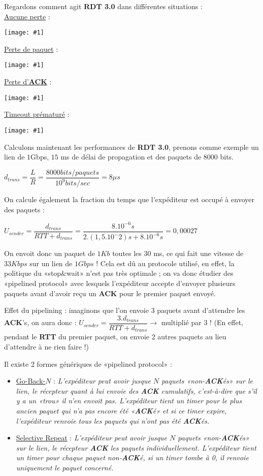 \documentclass{article}
\newcommand{\ora}[1]{\textcolor{darko}{#1}}
\newcommand{\imgR}[2]{\begin{center}\texttt{[image: \#1]}\end{center}}
\newcommand{\point}[2]{\item \ora{\underline{#1}} : \textit{#2}}
\begin{document}
Regardons comment agit \textbf{RDT 3.0} dans différentes situations : \\
\underline{Aucune perte} :  \imgR{CN_138.png}{300}
\newpage
\underline{Perte de paquet} :  \imgR{CN_139.png}{300}
\underline{Perte d'\textbf{ACK}} :  \imgR{CN_140.png}{300}

\newpage

\underline{Timeout prématuré} :  \imgR{CN_141.png}{300}

Calculons maintenant les performances de \textbf{RDT 3.0}, prenons comme exemple un lien de $1$Gbps, $15$ ms de 
délai de propagation et des paquets de 8000 bits.
\begin{center}
$d_{trans} = \dfrac{L}{R} = \dfrac{8000 bits/paquets}{10^9bits/sec} = 8\mu s$
\end{center}
On calcule également la fraction du temps que l'expéditeur est occupé à envoyer des paquets : 
\begin{center}
$U_{sender} = \dfrac{d_{trans}}{RTT+d_{trans}} = \dfrac{8.10^{-6}s}{2.(1,5.10^-2)s + 8.10^{-6}s} = 0,00027$
\end{center}

On envoit donc un paquet de $1Kb$ toutes les 30 ms, ce qui fait une vitesse de $33Kbps$ sur un lien de $1Gbps$ ! 
Cela est dû au protocole utilisé, en effet, la politique du «stop\&wait» n'est pas très optimale ; on va donc 
étudier des «pipelined protocol» avec lesquels l'expéditeur accepte d'envoyer plusieurs paquets avant d'avoir 
reçu un \textbf{ACK} pour le premier paquet envoyé.

Effet du pipelining : imaginons que l'on envoie 3 paquets avant d'attendre les \textbf{ACK}'s, on aura donc : 
$U_{sender} = \dfrac{3.d_{trans}}{RTT+d_{trans}} \rightarrow$ multiplié par 3 ! (En effet, pendant le 
\textbf{RTT} du premier paquet, on envoie 2 autres paquets au lieu d'attendre à ne rien faire !)

Il existe 2 formes génériques de «pipelined protocol» :
\begin{itemize}
\point{Go-Back-$N$}{L'expéditeur peut avoir jusque $N$ paquets «non-\textbf{ACK}és» sur le lien, le récepteur 
quant à lui envoie des \textbf{ACK} cumulatifs, c'est-à-dire que s'il y a un «trou» il n'en envoit pas. 
L'expéditeur tient un timer pour le plus ancien paquet qui n'a pas encore été «\textbf{ACK}é» et si ce timer
expire, l'expéditeur renvoie tous les paquets qui n'ont pas été \textbf{ACK}és.}
\point{Selective Repeat}{L'expéditeur peut avoir jusque $N$ paquets «non-\textbf{ACK}és» sur le lien, le 
récepteur \textbf{ACK} les paquets individuellement. L'expéditeur tient un timer pour chaque paquet 
non-\textbf{ACK}é, si un timer tombe à 0, il renvoie uniquement le paquet concerné.}
\end{itemize}
\end{document}
